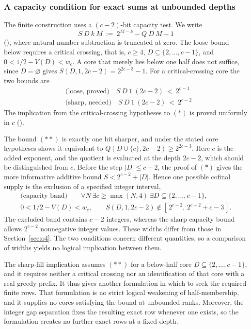\subsubsection{A capacity condition for exact sums at unbounded depths}
The finite construction uses a $(c-2)$-bit capacity test. We write
\[
\ensuremath{S}\ D\ k\ M\ :=\ 2^{M-k}-\ensuremath{Q}\ D\ M - 1
\]
(), where
natural-number subtraction is truncated at zero.  The loose
bound below requires a critical crossing, that is, $c\ge4$,
$D\subseteq\{2,\ldots,c-1\}$, and
$0<1/2-V(D)<w_c$.  A core that merely lies below one half does not suffice, since
$D=\varnothing$ gives $S(D,1,2c-2)=2^{2c-3}-1$.
For a critical-crossing core the two bounds are
\begin{align}
&\text{(loose, proved)}\quad \ensuremath{S}\ D\ 1\ (2c-2)\ <\ 2^{c-1}
\tag{$\ast$}\\
&\text{(sharp, needed)}\quad \ensuremath{S}\ D\ 1\ (2c-2)\ <\ 2^{c-2}
\tag{$\ast\ast$}
\end{align}
The implication from the critical-crossing hypotheses to $(\ast)$ is
proved uniformly in $c$
().

The bound $(\ast\ast)$ is exactly one bit sharper, and under the stated core hypotheses
shows it equivalent to
$Q(D\cup\{c\},2c-2)\ge2^{2c-3}$.
Here $c$ is the added exponent, and the quotient is evaluated at the
depth $2c-2$, which should be distinguished from $c$.
Before the step $|D|\le c-2$, the proof of $(\ast)$ gives the more informative additive bound
$S<2^{c-2}+|D|$.
Hence one possible cofinal supply is the exclusion
of a specified integer interval,
\[
\begin{gathered}
\text{(capacity band)}\qquad \forall N\ \exists c\ge\max(N,4)\ \exists D\subseteq\{2,\ldots,c-1\},\\
0<1/2-V(D)<w_c,\qquad
S(D,1,2c-2)\notin[\,2^{c-2},\,2^{c-2}+c-3\,].
\end{gathered}
\]
The excluded band contains $c-2$ integers, whereas the sharp capacity
bound allows $2^{c-2}$ nonnegative integer values.
These widths differ from those in Section~\ref{sec:o4}.  The two
conditions concern different quantities, so a comparison of widths
yields no logical implication between them.

The sharp-fill implication
assumes $(\ast\ast)$ for a below-half core
$D\subseteq\{2,\ldots,c-1\}$, and it requires neither a critical
crossing nor an identification of that core with a real greedy prefix.  It thus gives
another formulation in which to seek the required finite rows.
That formulation is no strict logical weakening of half-membership,
and it supplies no cores satisfying the bound at unbounded ranks.
Moreover, the integer gap separation fixes the resulting exact row
whenever one exists, so the formulation creates no further exact
rows at a fixed depth.

